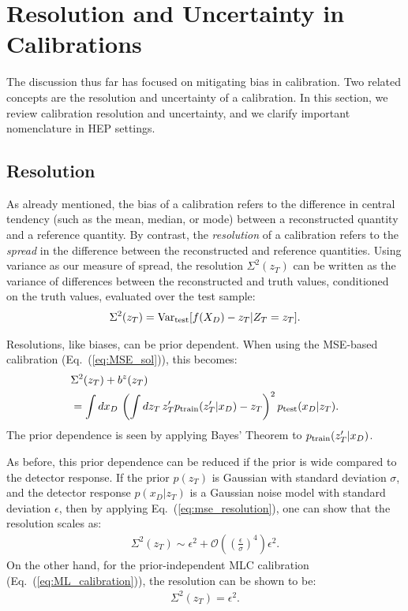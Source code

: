 \documentclass[aps,prd,reprint,preprintnumbers,superscriptaddress,nofootinbib,longbibliography,floatfix]{revtex4-1}
\DeclareRobustCommand{\Eq}[1]{Eq.~(\ref{eq:#1})}
\begin{document}
\section{Resolution and Uncertainty in Calibrations}\label{sec:resolution_uncertainty}

The discussion thus far has focused on mitigating bias in calibration. Two related concepts are the resolution and uncertainty of a calibration. In this section, we review calibration resolution and uncertainty, and we clarify important nomenclature in HEP settings.


\subsection{Resolution}
\label{sec:resolution}


 As already mentioned, the bias of a calibration refers to the difference in central tendency (such as the mean, median, or mode) between a reconstructed quantity and a reference quantity.
 By contrast, the \emph{resolution} of a calibration refers to the \emph{spread} in the difference between the reconstructed and reference quantities. Using variance as our measure of spread, the resolution $\Sigma^2(z_T)$ can be written as the variance of differences between the reconstructed and truth values, conditioned on the truth values, evaluated over the test sample:
 \begin{align}
     \Sigma^2(z_T) = {\rm Var}_{\rm test}[f(X_D)-z_T|Z_T=z_T].\label{eq:resolution}
 \end{align}
 

 Resolutions, like biases, can be prior dependent. When using the MSE-based calibration (\Eq{MSE_sol}), this becomes:
 \begin{align}
     &\Sigma^2(z_T) + b^z(z_T) \\ \label{eq:mse_resolution}
     &= \int dx_D\,\left(\int dz_T\,z_T'p_{\rm train}(z_T'|x_D) - z_T\right)^2 p_{\rm test}(x_D|z_T). \nonumber
 \end{align}
The prior dependence is seen by applying Bayes' Theorem to $p_{\rm train}(z_T'|x_D)$.

As before, this prior dependence can be reduced if the prior is wide compared to the detector response. 
%
If the prior $p(z_T)$ is Gaussian with standard deviation $\sigma$, and the detector response $p(x_D|z_T)$ is a Gaussian noise model with standard deviation $\epsilon$, then by applying \Eq{mse_resolution}, one can show that the resolution scales as:
%
\begin{align}
    \Sigma^2(z_T)\sim \epsilon^2  + \mathcal{O}\left(\left(\frac{\epsilon}{\sigma}\right)^4\right)\epsilon^2.
\end{align}
%
 On the other hand, for the prior-independent MLC calibration (\Eq{ML_calibration}), the resolution can be shown to be:
 \begin{align}
     \Sigma^2(z_T) = \epsilon^2 \label{eq:gaussian_resolution}.
 \end{align}
 
\end{document}
